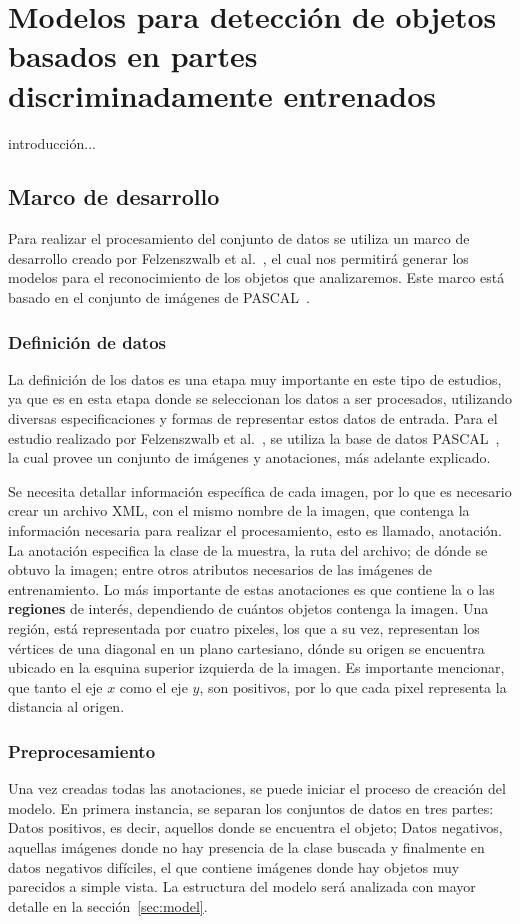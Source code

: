 \chapter[Modelos basados en partes ]{Modelos para detección de objetos basados en partes discriminadamente entrenados }\label{ch:framework}
introducción...

\section{Marco de desarrollo}
Para realizar el procesamiento del conjunto de datos se utiliza un marco de desarrollo creado por Felzenszwalb et al.~\cite{Felzenszwalb2010}, el cual nos permitirá generar los modelos para el reconocimiento de los objetos que analizaremos. Este marco está basado en el conjunto de imágenes de PASCAL~\cite{Everingham2010}.

\subsection{Definición de datos}
La definición de los datos es una etapa muy importante en este tipo de estudios, ya que es en esta etapa donde se seleccionan los datos a ser procesados, utilizando diversas especificaciones y formas de representar estos datos de entrada. Para el estudio realizado por Felzenszwalb et al.~\cite{Felzenszwalb2010}, se utiliza la base de datos PASCAL~\cite{Everingham2010}, la cual provee un conjunto de imágenes y anotaciones, más adelante explicado.

Se necesita detallar información específica de cada imagen, por lo que es necesario crear un archivo XML, con el mismo nombre de la imagen, que contenga la información necesaria para realizar el procesamiento, esto es llamado, anotación. La anotación especifica la clase de la muestra, la ruta del archivo; de dónde se obtuvo la imagen; entre otros atributos necesarios de las imágenes de entrenamiento. Lo más importante de estas anotaciones es que contiene la o las \textbf{regiones} de interés, dependiendo de cuántos objetos contenga la imagen. Una región, está representada por cuatro pixeles, los que a su vez, representan los vértices de una diagonal en un plano cartesiano, dónde su origen se encuentra ubicado en la esquina superior izquierda de la imagen. Es importante mencionar, que tanto el eje $x$ como el eje $y$, son positivos, por lo que cada pixel representa la distancia al origen.

\subsection{Preprocesamiento}
Una vez creadas todas las anotaciones, se puede iniciar el proceso de creación del modelo. En primera instancia, se separan los conjuntos de datos en tres partes: Datos positivos, es decir, aquellos donde se encuentra el objeto; Datos negativos, aquellas imágenes donde no hay presencia de la clase buscada y finalmente en datos negativos difíciles, el que contiene imágenes donde hay objetos muy parecidos a simple vista. La estructura del modelo será analizada con mayor detalle en la sección~\ref{sec:model}.


